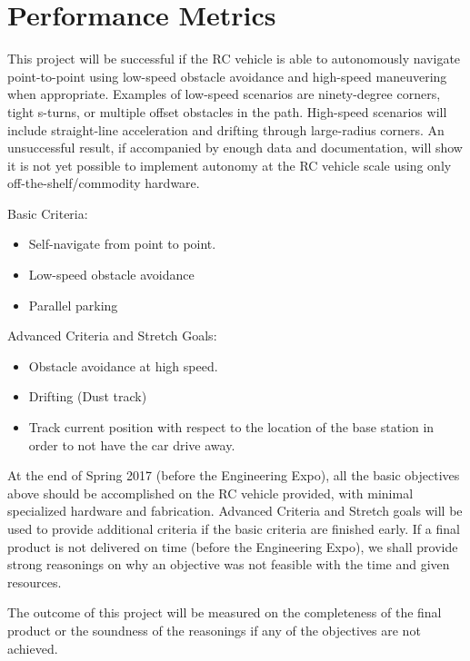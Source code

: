 \documentclass[draftclsnofoot,onecolumn,10pt]{IEEEtran}
\begin{document}
\section{Performance Metrics}
This project will be successful if the RC vehicle is able to autonomously navigate point-to-point using low-speed obstacle avoidance and high-speed maneuvering when appropriate. 
Examples of low-speed scenarios are ninety-degree corners, tight s-turns, or multiple offset obstacles in the path. 
High-speed scenarios will include straight-line acceleration and drifting through large-radius corners. 
An unsuccessful result, if accompanied by enough data and documentation, will show it is not yet possible to implement autonomy at the RC vehicle scale using only off-the-shelf/commodity hardware.\par
Basic Criteria:
\begin{itemize}
	\item Self-navigate from point to point.
	\item Low-speed obstacle avoidance
	\item Parallel parking
\end{itemize}
 Advanced Criteria and Stretch Goals:
 \begin{itemize}
	\item Obstacle avoidance at high speed.
	\item Drifting (Dust track) 
	\item Track current position with respect to the location of the base station in
		order to not have the car drive away.
\end{itemize}
At the end of Spring 2017 (before the Engineering Expo), all the basic objectives above should be accomplished on the RC vehicle provided, with minimal specialized hardware and fabrication. 
Advanced Criteria and Stretch goals will be used to provide additional criteria if the basic criteria are finished early.
If a final product is not delivered on time (before the Engineering Expo), we shall provide strong reasonings on why an objective was not feasible with the time and given resources.

The outcome of this project will be measured on the completeness of the final product or the soundness of the reasonings if any of the objectives are not achieved.


\end{document}
